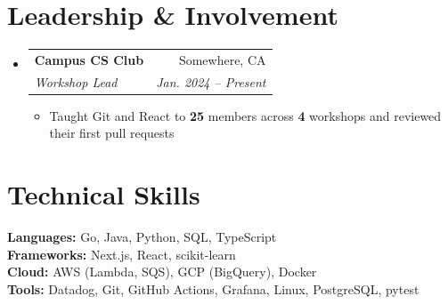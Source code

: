 \documentclass[letterpaper,10pt]{article}
\makeatletter
\newcommand{\resumeItem}[1]{%
  \item\small{#1}\vspace{-1pt}%
}
\newcommand{\resumeSubheading}[4]{
  \vspace{-1pt}\item\small
    \begin{tabular*}{0.97\textwidth}[t]{l@{\extracolsep{\fill}}r}
      \textbf{#1} & #2 \\
      \textit{#3} & \textit{#4} \\
      \end{tabular*}\vspace{-4pt}
}
\newcommand{\resumeSubHeadingListStart}{\begin{itemize}[leftmargin=0.12in, label={}, itemsep=1pt]}
\newcommand{\resumeSubHeadingListEnd}{\end{itemize}}
\newcommand{\resumeItemListStart}{\begin{itemize}[leftmargin=0.15in, itemsep=1.5pt, topsep=1pt]}
\newcommand{\resumeItemListEnd}{\end{itemize}\vspace{-2pt}}
\makeatother
\begin{document}
\section{Leadership \& Involvement}
  \resumeSubHeadingListStart
    \resumeSubheading
      {Campus CS Club}{Somewhere, CA}
      {Workshop Lead}{Jan. 2024 -- Present}
      \resumeItemListStart
        \resumeItem{Taught Git and React to \textbf{25} members across \textbf{4} workshops and reviewed their first pull requests}
      \resumeItemListEnd
  \resumeSubHeadingListEnd


\section{Technical Skills}
\vspace{-2pt}
 \begin{itemize}[leftmargin=0.12in, label={}]
    \footnotesize{\item{
     \textbf{Languages:} Go, Java, Python, SQL, TypeScript \\
     \textbf{Frameworks:} Next.js, React, scikit-learn \\
     \textbf{Cloud:} AWS (Lambda, SQS), GCP (BigQuery), Docker \\
     \textbf{Tools:} Datadog, Git, GitHub Actions, Grafana, Linux, PostgreSQL, pytest
    }}
 \end{itemize}
\end{document}
